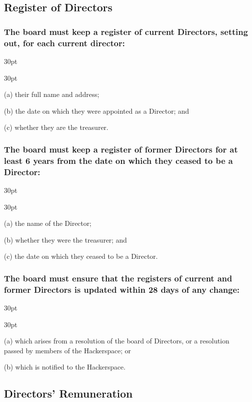 \documentclass[12pt]{article}
\def\clauseindent{30pt}
\newenvironment{subindentlist}{\raggedright\begin{adjustwidth}{\clauseindent}{}\begin{labeledlist}{\clauseindent}}{\end{labeledlist}\end{adjustwidth}}
\begin{document}
\subsection{Register of Directors}
\subsubsection[Register of Current Directors]{The board must keep a register of current Directors, setting out, for each current director:}
\begin{subindentlist}
    \item [(a)] their full name and address;
    \item [(b)] the date on which they were appointed as a Director; and
    \item [(c)] whether they are the treasurer.
\end{subindentlist}
\subsubsection[Register of Former Directors]{The board must keep a register of former Directors for at least 6 years from the date on which they ceased to be a Director:}
\begin{subindentlist}
    \item [(a)] the name of the Director;
    \item [(b)] whether they were the treasurer; and
    \item [(c)] the date on which they ceased to be a Director.
\end{subindentlist}
\subsubsection[Company Must Keep Registers of Directors Up-to-date]{The board must ensure that the registers of current and former Directors is updated within 28 days of any change:}
\begin{subindentlist}
    \item [(a)] which arises from a resolution of the board of Directors, or a resolution passed by members of the Hackerspace; or
    \item [(b)] which is notified to the Hackerspace.
\end{subindentlist}

\subsection{Directors' Remuneration}
\end{document}
